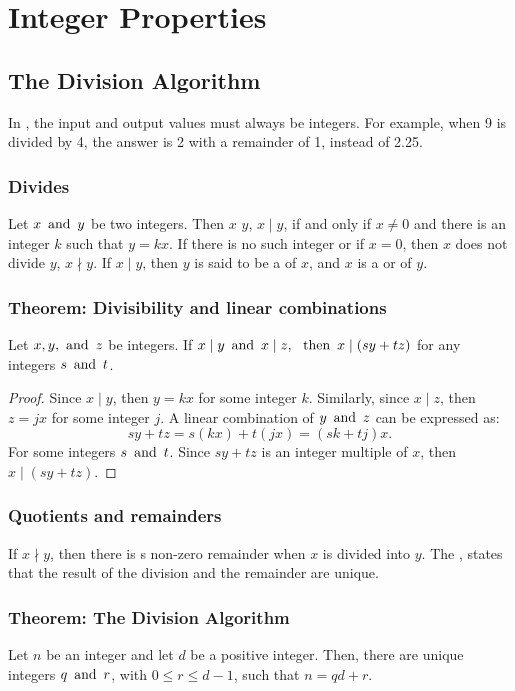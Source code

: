 \section{Integer Properties}
\subsection{The Division Algorithm}
In , the input and output values must always be integers. For example, when 9 is divided by 4, the answer is 2 with a remainder of 1, instead of 2.25.

\subsubsection*{Divides}
Let $x \operatorname{~\text{and}~} y$ be two integers. Then $x$  $y$, $x \mid y$, if and only if $x \neq 0$ and there is an integer $k$ such that $y = kx$. If there is no such integer or if $x = 0$, then $x$ does not divide $y$, $x \nmid y$. If $x \mid y$, then $y$ is said to be a  of $x$, and $x$ is a  or  of $y$.

\subsubsection*{Theorem: Divisibility and linear combinations}
Let $x,y,\operatorname{~\text{and}~} z$ be integers. If $x \mid y \operatorname{~\text{and}~} x \mid z,~\operatorname{~\text{then}~} x \mid (sy+tz)$ for any integers $s \operatorname{~\text{and}~} t$.
\begin{proof}
  Since $x \mid y$, then $y = kx$ for some integer $k$. Similarly, since $x \mid z$, then $z = jx$ for some integer $j$. A linear combination of $y \operatorname{~\text{and}~} z$ can be expressed as:
  \[
    sy + tz = s(kx) + t(jx) = (sk + tj)x.
  \]
  For some integers $s \operatorname{~\text{and}~} t$. Since $sy + tz$ is an integer multiple of $x$, then $x \mid (sy + tz)$.
\end{proof}

\subsubsection*{Quotients and remainders}
If $x \nmid y$, then there is s non-zero remainder when $x$ is divided into $y$. The , states that the result of the division and the remainder are unique.

\subsubsection*{Theorem: The Division Algorithm}
Let $n$ be an integer and let $d$ be a positive integer. Then, there are unique integers $q \operatorname{~\text{and}~} r$, with $0 \leq r \leq d-1$, such that $n = qd + r$.

